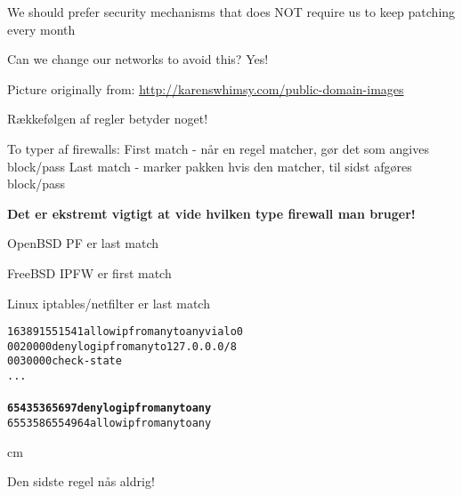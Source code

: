 \documentclass[Screen16to9,17pt]{foils}
\begin{document}



\begin{list2}
\item We should prefer security mechanisms that does NOT require us to keep patching every month
\item Can we change our networks to avoid this? Yes!
\end{list2}



\centerline{Picture originally from: \url{http://karenswhimsy.com/public-domain-images}}




\begin{list1}
\item Rækkefølgen af regler betyder noget!
\begin{list2}
\item To typer af firewalls:
 First match - når en regel matcher, gør det som angives block/pass
 Last match  - marker pakken hvis den matcher, til sidst afgøres block/pass
\end{list2}
\item {\bf Det er ekstremt vigtigt at vide hvilken type firewall
    man bruger!}
\item OpenBSD PF er last match
\item FreeBSD IPFW er first match
\item Linux iptables/netfilter er last match
\end{list1}






\begin{alltt}
 16389  1551541 allow ip from any to any via lo0
00200     0        0 deny log ip from any to 127.0.0.0/8
00300     0        0 check-state
...
{\bfseries
65435    36     5697 deny log ip from any to any}
65535   865    54964 allow ip from any to any
\end{alltt}

 cm

\centerline{Den sidste regel nås aldrig!}
\end{document}
